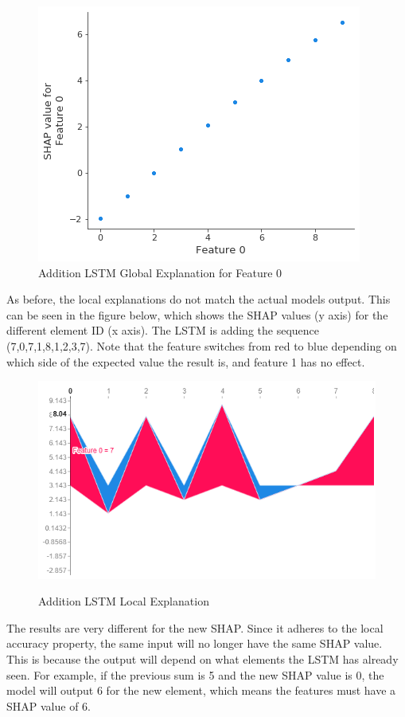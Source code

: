 \documentclass[12pt]{article}
\begin{document}
\begin{figure}[H]
\centering\caption{Addition LSTM Global Explanation for Feature 0}
\includegraphics[scale=0.7]{Sanity Old Global Feature.png}
\end{figure}
As before, the local explanations do not match the actual models output. This can be seen in the figure below, which shows the SHAP values (y axis) for the different element ID (x axis). The LSTM is adding the sequence (7,0,7,1,8,1,2,3,7). Note that the feature switches from red to blue depending on which side of the expected value the result is, and feature 1 has no effect. 

\begin{figure}[H]
\centering\caption{Addition LSTM Local Explanation}
\includegraphics[scale=0.6]{Sanity Old Local.png}
\label{Sanity Old Local}
\end{figure}

The results are very different for the new SHAP. Since it adheres to the local accuracy property, the same input will no longer have the same SHAP value. This is because the output will depend on what elements the LSTM has already seen. For example, if the previous sum is 5 and the new SHAP value is 0, the model will output 6 for the new element, which means the features must have a SHAP value of 6.
\end{document}
